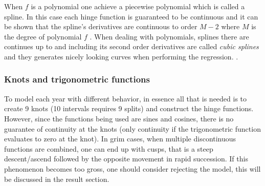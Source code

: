 When $f$ is a polynomial one achieve a piecewise polynomial which is called a spline.
In this case each hinge function is guaranteed to be continuous and it can be shown that the spline's derivatives are continuous to order $M-2$ where $M$ is the degree of polynomial $f$ \cite[p.~144]{statistical-learning}. When dealing with polynomials, splines there are continues up to and including its second order derivatives are called \textit{cubic splines} and they generates nicely looking curves when performing the regression. \cite[p.~143]{statistical-learning}.

\subsubsection{Knots and trigonometric functions}
To model each year with different behavior, in essence all that is needed is to create 9 knots (10 intervals requires 9 splits) and construct the hinge functions.
However, since the functions being used are sines and cosines, there is no guarantee of continuity at the knots (only continuity if the trigonometric function evaluates to zero at the knot).
In grim cases, when multiple discontinuous functions are combined, one can end up with cusps, that is a steep descent/ascend followed by the opposite movement in rapid succession.
If this phenomenon becomes too gross, one should consider rejecting the model, this will be discussed in the result section. 
